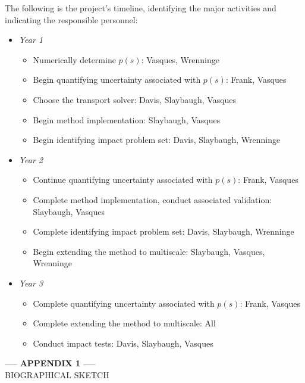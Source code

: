 \documentclass[12pt]{article}
\begin{document}
The following is the project's timeline, identifying the major activities and indicating the responsible personnel:
\begin{itemize}
\item \textit{Year 1}
\begin{itemize}[noitemsep]
\item Numerically determine $p(s)$: Vasques, Wrenninge
\item Begin quantifying uncertainty associated with $p(s)$: Frank, Vasques
\item Choose the transport solver: Davis, Slaybaugh, Vasques
\item Begin method implementation: Slaybaugh, Vasques
\item Begin identifying impact problem set: Davis, Slaybaugh, Wrenninge
\end{itemize}
\item \textit{Year 2}
\begin{itemize}[noitemsep]
\item Continue quantifying uncertainty associated with $p(s)$: Frank, Vasques
\item Complete method implementation, conduct associated validation: Slaybaugh, Vasques
\item Complete identifying impact problem set: Davis, Slaybaugh, Wrenninge
\item Begin extending the method to multiscale: Slaybaugh, Vasques, Wrenninge
\end{itemize}
\item \textit{Year 3}
\begin{itemize}[noitemsep]
\item Complete quantifying uncertainty associated with $p(s)$: Frank, Vasques
\item Complete extending the method to multiscale: All
\item Conduct impact tests: Davis, Slaybaugh, Vasques
\end{itemize}
\end{itemize}

\pagebreak

  
\vspace*{\fill}
\begin{center}
{-----  {\bf APPENDIX 1} ----- \\
BIOGRAPHICAL SKETCH} 
\end{center}
\vspace*{\fill}
\end{document}
